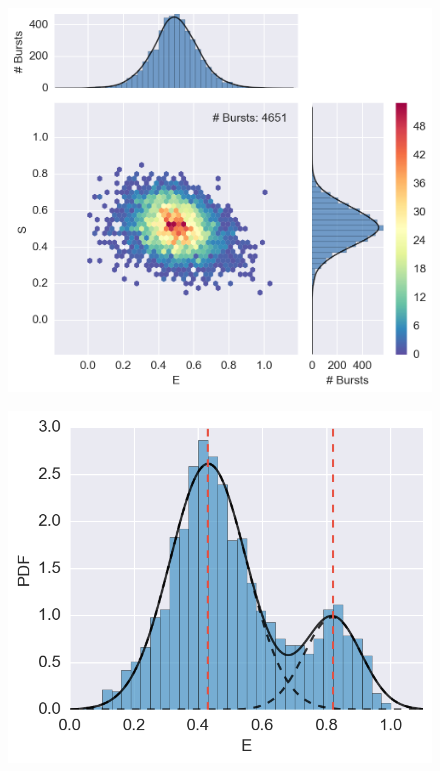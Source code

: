 \begin{figure}
\begin{center}
\includegraphics[width=\singlefig]{"figures/alex_jointplot_fretsel/alex_jointplot_fretsel"}
\caption[]{}
\end{center}
\end{figure}



\begin{figure}
\begin{center}
\includegraphics[width=0.8\singlefig]{"figures/hist_fit/hist_fit"}
\caption[]{}
\end{center}
\end{figure}

